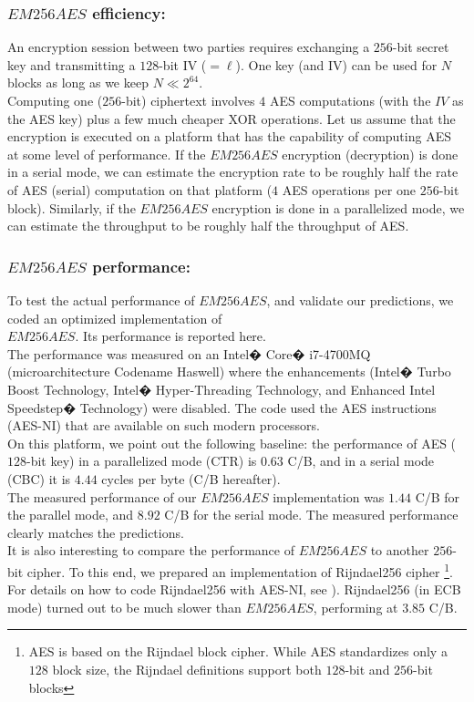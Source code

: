 \documentclass{llncs}
\begin{document}
\subsubsection{$EM256AES$ efficiency:}
An encryption session between two parties requires exchanging a $256$-bit secret key and transmitting a $128$-bit IV ($=\ell$). One key (and IV) can be used for $N$ blocks as long as we keep $N \ll 2^{64}$. \\
Computing one ($256$-bit) ciphertext involves $4$ AES computations (with the $IV$ as the AES key) plus a few much cheaper XOR operations. Let us assume that the encryption is executed on a platform that has the capability of computing AES at some level of performance. If the $EM256AES$ encryption (decryption) is done in a serial mode, we can estimate the encryption rate to be roughly half the rate of AES (serial) computation on that platform ($4$ AES operations per one $256$-bit block). Similarly, if the $EM256AES$ encryption is done in a parallelized mode, we can estimate the throughput to be roughly half the throughput of AES.

\subsubsection{$EM256AES$ performance:}
To test the actual performance of $EM256AES$, and validate our predictions, we coded an optimized implementation of \\
$EM256AES$. Its performance is reported here. \\
The performance was measured on an Intel� Core� i7-4700MQ (microarchitecture Codename Haswell) where the enhancements (Intel� Turbo Boost Technology, Intel� Hyper-Threading Technology, and Enhanced Intel Speedstep� Technology) were disabled. The code used the AES instructions (AES-NI) that are available on such modern processors. \\
On this platform, we point out the following baseline: the performance of AES ($128$-bit key) in a parallelized mode (CTR) is $0.63$ C/B, and in a serial mode (CBC) it is $4.44$ cycles per byte (C/B hereafter). \\
The measured performance of our $EM256AES$ implementation was $1.44$ C/B for the parallel mode, and $8.92$ C/B for the serial mode. The measured performance clearly matches the predictions. \\
It is also interesting to compare the performance of $EM256AES$ to another $256$-bit cipher. To this end, we prepared an implementation of Rijndael256 cipher \cite{Rijndael256}
\footnote[2]{AES is based on the Rijndael block cipher. While AES standardizes only a $128$ block size, the Rijndael definitions support both $128$-bit and $256$-bit blocks}. For details on how to code Rijndael256 with AES-NI, see \cite{Gueron_WP}). Rijndael256 (in ECB mode) turned out to be much slower than $EM256AES$, performing at $3.85$ C/B.
\end{document}
